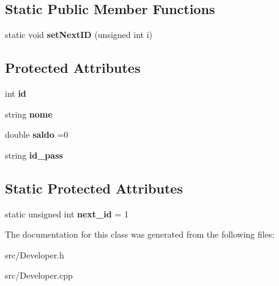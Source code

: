 \subsection*{Static Public Member Functions}
\begin{DoxyCompactItemize}
\item 
\hypertarget{class_developer_abc49de08222dae89d042daeff3ad8098}{static void {\bfseries set\+Next\+I\+D} (unsigned int i)}\label{class_developer_abc49de08222dae89d042daeff3ad8098}

\end{DoxyCompactItemize}
\subsection*{Protected Attributes}
\begin{DoxyCompactItemize}
\item 
\hypertarget{class_developer_a4e09440e28b980b66fe81402b5878332}{int {\bfseries id}}\label{class_developer_a4e09440e28b980b66fe81402b5878332}

\item 
\hypertarget{class_developer_ac93712aacdeeed34b0d5ea3723be8639}{string {\bfseries nome}}\label{class_developer_ac93712aacdeeed34b0d5ea3723be8639}

\item 
\hypertarget{class_developer_a87c8d2a8bec77c561d29a82d93d34d40}{double {\bfseries saldo} =0}\label{class_developer_a87c8d2a8bec77c561d29a82d93d34d40}

\item 
\hypertarget{class_developer_a2747bee58df1c3c0a74a7932d1cb8d3e}{string {\bfseries id\+\_\+pass}}\label{class_developer_a2747bee58df1c3c0a74a7932d1cb8d3e}

\end{DoxyCompactItemize}
\subsection*{Static Protected Attributes}
\begin{DoxyCompactItemize}
\item 
\hypertarget{class_developer_a54dcfbe646de46842a473b19ff56a3fd}{static unsigned int {\bfseries next\+\_\+id} = 1}\label{class_developer_a54dcfbe646de46842a473b19ff56a3fd}

\end{DoxyCompactItemize}


The documentation for this class was generated from the following files\+:\begin{DoxyCompactItemize}
\item 
src/Developer.\+h\item 
src/Developer.\+cpp\end{DoxyCompactItemize}
